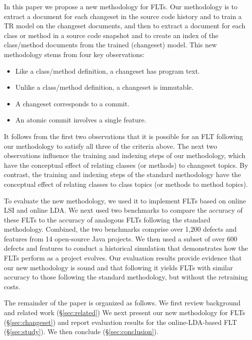 In this paper we propose a new methodology for FLTs.
Our methodology is to extract a document for each changeset in the source code history and to train a TR model on the changeset documents, and then to extract a document for each class or method in a source code snapshot and to create an index of the class/method documents from the trained (changeset) model.
This new methodology stems from four key observations:
\begin{itemize}[leftmargin=*]
  \item
    Like a class/method definition, a changeset has program text.
  \item
    Unlike a class/method definition, a changeset is immutable.
  \item
    A changeset corresponds to a commit.
  \item
    An atomic commit involves a single feature.
\end{itemize}
It follows from the first two observations that it is possible for an FLT following our methodology to satisfy all three of the criteria above.
The next two observations influence the training and indexing steps of our methodology,
which have the conceptual effect of relating classes (or methods) to changeset topics.
By contrast, the training and indexing steps of the standard methodology
have the conceptual effect of relating classes to class topics (or methods to method topics).

To evaluate the new methodology, we used it to implement FLTs based on online LSI and online LDA.
We next used two benchmarks to compare the accuracy of these FLTs to the accuracy of analogous FLTs following the standard methodology.
Combined, the two benchmarks comprise over 1,200 defects and features from 14 open-source Java projects.
We then used a subset of over 600 defects and features to conduct a historical simulation that demonstrates how the FLTs perform as a project evolves.
Our evaluation results provide evidence that our new methodology is sound and that following it yields FLTs with similar accuracy to those following the standard methodology, but without the retraining costs.

The remainder of the paper is organized as follows.
We first review background and related work (\S\ref{sec:related})
We next present our new methodology for FLTs (\S\ref{sec:changeset}) and report evaluation results for the online-LDA-based FLT (\S\ref{sec:study}).
We then conclude (\S\ref{sec:conclusion}).




